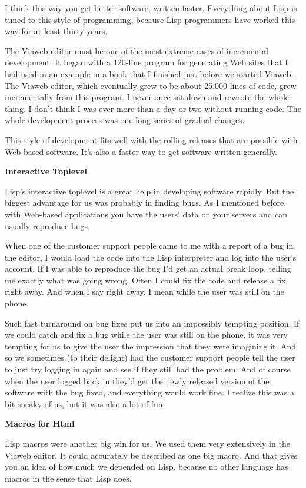 I think this way you get better software, written faster. Everything
about Lisp is tuned to this style of programming, because Lisp
programmers have worked this way for at least thirty years.

The Viaweb editor must be one of the most extreme cases of incremental
development. It began with a 120-line program for generating Web sites
that I had used in an example in a book that I finished just before we
started Viaweb. The Viaweb editor, which eventually grew to be about
25,000 lines of code, grew incrementally from this program. I never once
sat down and rewrote the whole thing. I don't think I was ever more than
a day or two without running code. The whole development process was one
long series of gradual changes.

This style of development fits well with the rolling releases that are
possible with Web-based software. It's also a faster way to get software
written generally.

\textbf{Interactive Toplevel}

Lisp's interactive toplevel is a great help in developing software
rapidly. But the biggest advantage for us was probably in finding bugs.
As I mentioned before, with Web-based applications you have the users'
data on your servers and can usually reproduce bugs.

When one of the customer support people came to me with a report of a
bug in the editor, I would load the code into the Lisp interpreter and
log into the user's account. If I was able to reproduce the bug I'd get
an actual break loop, telling me exactly what was going wrong. Often I
could fix the code and release a fix right away. And when I say right
away, I mean while the user was still on the phone.

Such fast turnaround on bug fixes put us into an impossibly tempting
position. If we could catch and fix a bug while the user was still on
the phone, it was very tempting for us to give the user the impression
that they were imagining it. And so we sometimes (to their delight) had
the customer support people tell the user to just try logging in again
and see if they still had the problem. And of course when the user
logged back in they'd get the newly released version of the software
with the bug fixed, and everything would work fine. I realize this was a
bit sneaky of us, but it was also a lot of fun.

\textbf{Macros for Html}

Lisp macros were another big win for us. We used them very extensively
in the Viaweb editor. It could accurately be described as one big macro.
And that gives you an idea of how much we depended on Lisp, because no
other language has macros in the sense that Lisp does.

